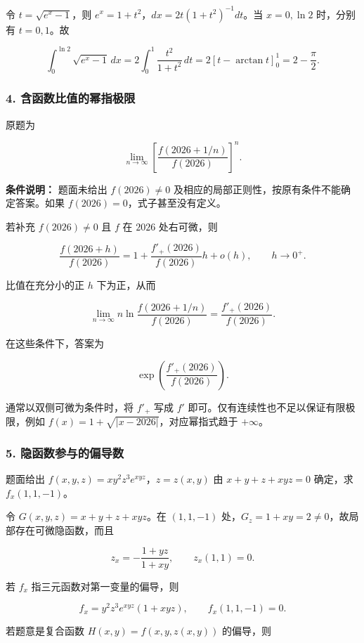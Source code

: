 \documentclass[11pt,fontset=fandol]{ctexart}
\begin{document}
令 \(t=\sqrt{e^x-1}\)，则 \(e^x=1+t^2\)，\(dx=2t(1+t^2)^{-1}dt\)。当
\(x=0,\ln2\) 时，分别有 \(t=0,1\)。故

\[
\int_0^{\ln2}\sqrt{e^x-1}\,dx
=2\int_0^1\frac{t^2}{1+t^2}\,dt
=2[t-\arctan t]_0^1
=\boxed{2-\frac\pi2}.
\]

\subsubsection{4.
含函数比值的幂指极限}\label{ux542bux51fdux6570ux6bd4ux503cux7684ux5e42ux6307ux6781ux9650}

原题为

\[
\lim_{n\to\infty}\left[\frac{f(2026+1/n)}{f(2026)}\right]^n.
\]

\textbf{条件说明：} 题面未给出 \(f(2026)\ne0\)
及相应的局部正则性，按原有条件不能确定答案。如果
\(f(2026)=0\)，式子甚至没有定义。

若补充 \(f(2026)\ne0\) 且 \(f\) 在 \(2026\) 处右可微，则

\[
\frac{f(2026+h)}{f(2026)}
=1+\frac{f'_+(2026)}{f(2026)}h+o(h),\qquad h\to0^+.
\]

比值在充分小的正 \(h\) 下为正，从而

\[
\lim_{n\to\infty}n\ln\frac{f(2026+1/n)}{f(2026)}
=\frac{f'_+(2026)}{f(2026)}.
\]

在这些条件下，答案为

\[
\boxed{\exp\!\left(\frac{f'_+(2026)}{f(2026)}\right)}.
\]

通常以双侧可微为条件时，将 \(f'_+\) 写成 \(f'\)
即可。仅有连续性也不足以保证有限极限，例如
\(f(x)=1+\sqrt{|x-2026|}\)，对应幂指式趋于 \(+\infty\)。

\subsubsection{5.
隐函数参与的偏导数}\label{ux9690ux51fdux6570ux53c2ux4e0eux7684ux504fux5bfcux6570}

题面给出 \(f(x,y,z)=xy^2z^3e^{xyz}\)，\(z=z(x,y)\) 由 \(x+y+z+xyz=0\)
确定，求 \(f_x(1,1,-1)\)。

令 \(G(x,y,z)=x+y+z+xyz\)。在 \((1,1,-1)\)
处，\(G_z=1+xy=2\ne0\)，故局部存在可微隐函数，而且

\[
z_x=-\frac{1+yz}{1+xy},\qquad z_x(1,1)=0.
\]

若 \(f_x\) 指三元函数对第一变量的偏导，则

\[
f_x=y^2z^3e^{xyz}(1+xyz),\qquad f_x(1,1,-1)=0.
\]

若题意是复合函数 \(H(x,y)=f(x,y,z(x,y))\) 的偏导，则
\end{document}
